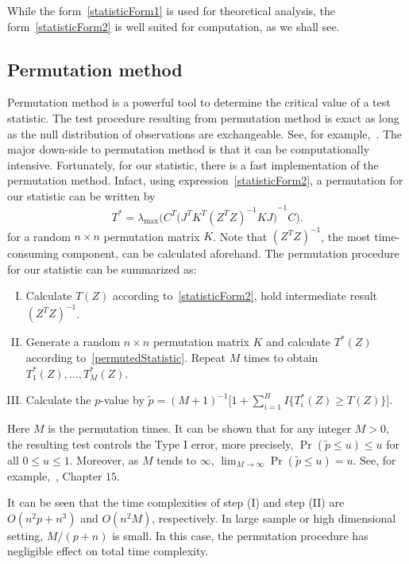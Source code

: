 \documentclass[review]{elsarticle}
\theoremstyle{plain}
\theoremstyle{definition}
\theoremstyle{remark}
\begin{document}
While the form~\eqref{statisticForm1} is used for theoretical analysis, the form~\eqref{statisticForm2} is well suited for computation, as we shall see.
\subsection{Permutation method}
Permutation method is a powerful tool to determine the critical value of a test statistic.
   The test procedure resulting from permutation method is exact as long as the null distribution of observations are exchangeable. See, for example,~\cite{Romano1990On}.
   The major down-side to permutation method is that it can be computationally intensive.
   Fortunately, for our statistic, there is a fast implementation of the permutation method.
   Infact, using expression~\eqref{statisticForm2}, a permutation for our statistic can be written by
    \begin{equation}\label{permutedStatistic}
        T^{*}=\lambda_{\max}\Big(C^T{\big( J^T K^T {(Z^T Z)}^{-1} K J \big)}^{-1}  C\Big).
    \end{equation}
   for a random $n\times n$ permutation matrix $K$.
   Note that ${(Z^T Z)}^{-1}$, the most time-consuming component, can be calculated aforehand.
   The permutation procedure for our statistic can be summarized as:
   \begin{enumerate}[(I)]
       \item Calculate $T(Z)$ according to~\eqref{statisticForm2}, hold intermediate result ${(Z^T Z)}^{-1}$.
       \item Generate a random $n\times n$ permutation matrix $K$ and calculate $T^*(Z)$ according to~\eqref{permutedStatistic}. Repeat $M$ times to obtain $T^*_1(Z),\ldots,T^*_M(Z)$.
       \item Calculate the $p$-value by
           $
           \tilde{p}={(M+1)}^{-1}\big[1+\sum_{i=1}^B I\{T^*_i(Z)\geq T(Z)\}\big]
           $.
   \end{enumerate}

Here $M$ is the permutation times. 
   It can be shown that for any integer $M>0$, the resulting test controls the Type I error, more precisely, $\Pr(\tilde{p}\leq u)\leq u$ for all $0\leq u\leq 1$.
   Moreover, as $M$ tends to $\infty$, $\lim_{M\to \infty}\Pr(\tilde{p}\leq u)= u$.
   See, for example,~\cite{Lehmann}, Chapter $15$.

   It can be seen that the time complexities of step (I) and step (II) are $O(n^2 p +n^3)$ and $O(n^2 M)$, respectively.
   In large sample or high dimensional setting, $M/(p+n)$ is small. In this case, the permutation procedure has negligible effect on total time complexity.
\end{document}
